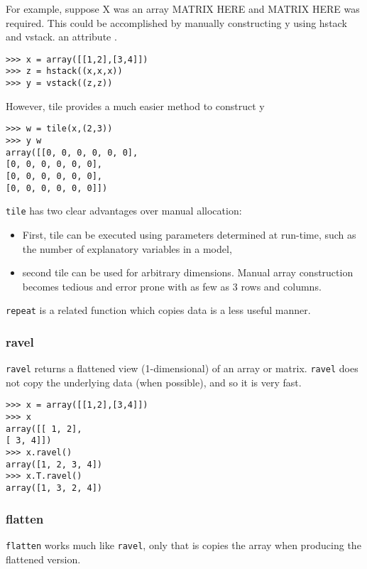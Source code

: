 \documentclass[KSmain.tex]{subfiles}
\begin{document}
For example, suppose X was an array
MATRIX HERE
and 
MATRIX HERE
was required. This could be accomplished by manually constructing y using hstack and vstack.
an attribute .
\begin{framed}
\begin{verbatim}
>>> x = array([[1,2],[3,4]])
>>> z = hstack((x,x,x))
>>> y = vstack((z,z))
\end{verbatim}
\end{framed}
However, tile provides a much easier method to construct y
\begin{framed}
\begin{verbatim}
>>> w = tile(x,(2,3))
>>> y w
array([[0, 0, 0, 0, 0, 0],
[0, 0, 0, 0, 0, 0],
[0, 0, 0, 0, 0, 0],
[0, 0, 0, 0, 0, 0]])
\end{verbatim}
\end{framed}
\texttt{tile} has two clear advantages over manual allocation: 
\begin{itemize} 
\item First, tile can be executed using parameters determined
at run-time, such as the number of explanatory variables in a model,
\item second tile can be
used for arbitrary dimensions. Manual array construction becomes tedious and error prone with as few
as 3 rows and columns. 
\end{itemize}
\texttt{repeat} is a related function which copies data is a less useful manner.

\subsubsection{ravel}
\texttt{ravel} returns a flattened view (1-dimensional) of an array or matrix. \texttt{ravel} does not copy the underlying
data (when possible), and so it is very fast.
\begin{framed}
\begin{verbatim}
>>> x = array([[1,2],[3,4]])
>>> x
array([[ 1, 2],
[ 3, 4]])
>>> x.ravel()
array([1, 2, 3, 4])
>>> x.T.ravel()
array([1, 3, 2, 4])
\end{verbatim}
\end{framed}
\subsubsection{flatten}
\texttt{flatten} works much like \texttt{ravel}, only that is copies the array when producing the flattened version.
\end{document}

